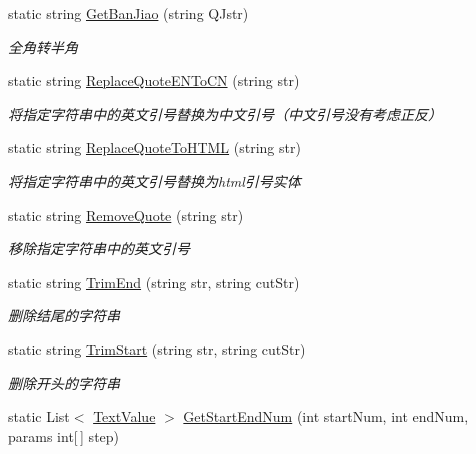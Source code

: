 \begin{DoxyCompactItemize}
static string \hyperlink{class_x_c_l_net_tools_1_1_string_hander_1_1_common_a2951e9d8596697ebd7b2f454d9253d91}{Get\+Ban\+Jiao} (string Q\+Jstr)
\begin{DoxyCompactList}\small\item\em 全角转半角 \end{DoxyCompactList}\item 
static string \hyperlink{class_x_c_l_net_tools_1_1_string_hander_1_1_common_af1c235bbfc59dedcaeb0731301226c3b}{Replace\+Quote\+E\+N\+To\+CN} (string str)
\begin{DoxyCompactList}\small\item\em 将指定字符串中的英文引号替换为中文引号（中文引号没有考虑正反） \end{DoxyCompactList}\item 
static string \hyperlink{class_x_c_l_net_tools_1_1_string_hander_1_1_common_adecc464f722d6bc0e3ab9ba42277d730}{Replace\+Quote\+To\+H\+T\+ML} (string str)
\begin{DoxyCompactList}\small\item\em 将指定字符串中的英文引号替换为html引号实体 \end{DoxyCompactList}\item 
static string \hyperlink{class_x_c_l_net_tools_1_1_string_hander_1_1_common_a7ac48e68f1f3943c8e8425df41aa52ca}{Remove\+Quote} (string str)
\begin{DoxyCompactList}\small\item\em 移除指定字符串中的英文引号 \end{DoxyCompactList}\item 
static string \hyperlink{class_x_c_l_net_tools_1_1_string_hander_1_1_common_a3ed633ff7c9b12a2d63ebe9eb8fd7dd2}{Trim\+End} (string str, string cut\+Str)
\begin{DoxyCompactList}\small\item\em 删除结尾的字符串 \end{DoxyCompactList}\item 
static string \hyperlink{class_x_c_l_net_tools_1_1_string_hander_1_1_common_afcc9efd028a6a7937e8f75307e78b54c}{Trim\+Start} (string str, string cut\+Str)
\begin{DoxyCompactList}\small\item\em 删除开头的字符串 \end{DoxyCompactList}\item 
static List$<$ \hyperlink{class_x_c_l_net_tools_1_1_entity_1_1_text_value}{Text\+Value} $>$ \hyperlink{class_x_c_l_net_tools_1_1_string_hander_1_1_common_a34f200ef899d3b8ff3bff707f86c24d2}{Get\+Start\+End\+Num} (int start\+Num, int end\+Num, params int\mbox{[}$\,$\mbox{]} step)

\end{DoxyCompactItemize}

